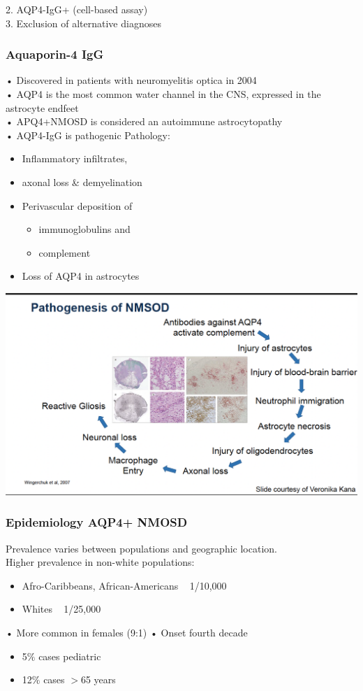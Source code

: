 \begin{itemize}
\begin{itemize}
2. AQP4-IgG+ (cell-based assay)
\\3. Exclusion of alternative diagnoses
\subsubsection{Aquaporin-4 IgG}
• Discovered in patients with neuromyelitis optica in 2004
\\• AQP4 is the most common water channel in the CNS, expressed in the astrocyte endfeet
\\• APQ4+NMOSD is considered an autoimmune astrocytopathy
\\• AQP4-IgG is pathogenic
Pathology:
\begin{itemize}
    \item Inflammatory infiltrates,
\item axonal loss & demyelination
\item  Perivascular deposition of
\begin{itemize}
    \item immunoglobulins and
\item complement
\end{itemize}

\item Loss of AQP4 in astrocytes
\end{itemize}
\includegraphics[width=1\textwidth]{Images/PathogenesisNMSOD.png}\\[1cm]
\subsubsection{Epidemiology AQP4+ NMOSD}
Prevalence varies between populations and
geographic location.
\\Higher prevalence in non-white populations:
\begin{itemize}
    \item Afro-Caribbeans, African-Americans
~ 1/10,000
\item Whites ~ 1/25,000
\end{itemize}
• More common in females (9:1)
• Onset fourth decade
\begin{itemize}
    \item 5$\%$ cases pediatric
\item 12$\%$ cases $>$65 years
\end{itemize}


\end{itemize}
\end{itemize}
